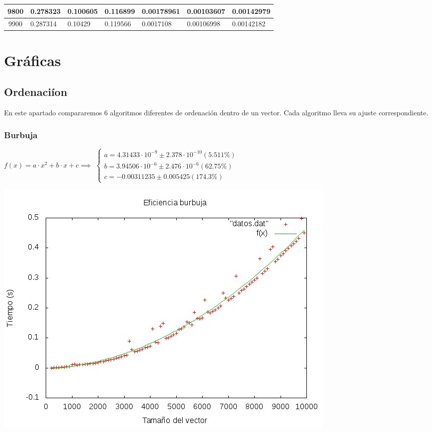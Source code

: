 \documentclass[11pt,spanish]{article} %
\begin{document}
\begin{center}
\begin{longtable}{|c|l|l|l|l|l|l|}
9800 & 0.278323                     & 0.100605                       & 0.116899                       & 0.00178961                     & 0.00103607                     & 0.00142979                    \\ \hline
9900 & 0.287314                     & 0.10429                        & 0.119566                       & 0.0017108                      & 0.00106998                     & 0.00142182                    \\ \hline
\end{longtable}
\end{center}

\newpage

\section{Gr\'aficas}

\subsection{Ordenaci\'ion}
En este apartado compararemos 6 algoritmos diferentes de ordenación dentro de un vector.
Cada algoritmo lleva su ajuste correspondiente.

\subsubsection{Burbuja}
$f(x) = a\cdot x^2 + b\cdot x + c \implies$
$\left\{ \begin{array}{c}
a               = 4.31433\cdot 10^{-9}      \pm 2.378\cdot 10^{-10}    (5.511\%) \\
b               = 3.94506\cdot 10^{-6}      \pm 2.476\cdot 10^{-6}    (62.75\%) \\
c               = -0.00311235      \pm 0.005425     (174.3\%)
\end{array}\right.$
\begin{center}
\includegraphics[scale=0.55]{../Graficas/Burbuja/burbujaO0_ruben.jpeg}
\end{center}
\end{document}
